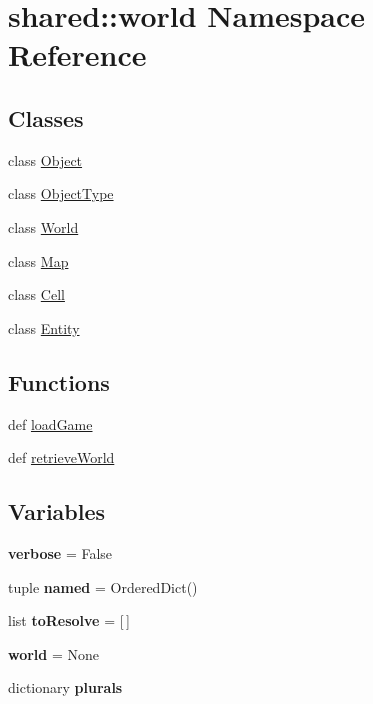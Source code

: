 \hypertarget{namespaceshared_1_1world}{\section{shared\-:\-:world \-Namespace \-Reference}
\label{namespaceshared_1_1world}
}
\subsection*{\-Classes}
\begin{DoxyCompactItemize}
\item 
class \hyperlink{classshared_1_1world_1_1_object}{\-Object}
\item 
class \hyperlink{classshared_1_1world_1_1_object_type}{\-Object\-Type}
\item 
class \hyperlink{classshared_1_1world_1_1_world}{\-World}
\item 
class \hyperlink{classshared_1_1world_1_1_map}{\-Map}
\item 
class \hyperlink{classshared_1_1world_1_1_cell}{\-Cell}
\item 
class \hyperlink{classshared_1_1world_1_1_entity}{\-Entity}
\end{DoxyCompactItemize}
\subsection*{\-Functions}
\begin{DoxyCompactItemize}
\item 
def \hyperlink{namespaceshared_1_1world_a97d6c53e6b341065f11a995913742f76}{load\-Game}
\item 
def \hyperlink{namespaceshared_1_1world_a31675f3d71fbd6c181dbfd91a84ebc9b}{retrieve\-World}
\end{DoxyCompactItemize}
\subsection*{\-Variables}
\begin{DoxyCompactItemize}
\item 
\hypertarget{namespaceshared_1_1world_a1c4ead9007ea8e668d20ecf0f95c2b8c}{{\bfseries verbose} = \-False}\label{namespaceshared_1_1world_a1c4ead9007ea8e668d20ecf0f95c2b8c}

\item 
\hypertarget{namespaceshared_1_1world_a289804ef1b476a942b99ea3bd17d14cd}{tuple {\bfseries named} = \-Ordered\-Dict()}\label{namespaceshared_1_1world_a289804ef1b476a942b99ea3bd17d14cd}

\item 
\hypertarget{namespaceshared_1_1world_a1048d4ebc9a90ad8f8413236728f78e6}{list {\bfseries to\-Resolve} = \mbox{[}$\,$\mbox{]}}\label{namespaceshared_1_1world_a1048d4ebc9a90ad8f8413236728f78e6}

\item 
\hypertarget{namespaceshared_1_1world_a3528549e0808dcae9c2f28415f530a08}{{\bfseries world} = \-None}\label{namespaceshared_1_1world_a3528549e0808dcae9c2f28415f530a08}

\item 
dictionary {\bfseries plurals}
\end{DoxyCompactItemize}


